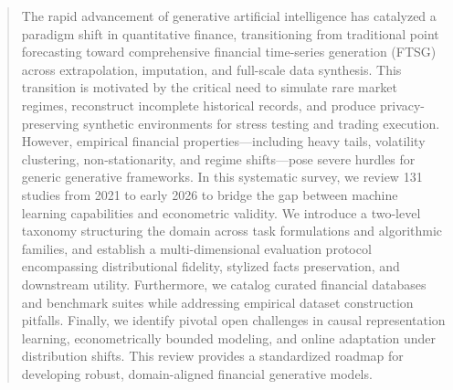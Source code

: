 \begin{abstract}
The rapid advancement of generative artificial intelligence has catalyzed a paradigm shift in quantitative finance, transitioning from traditional point forecasting toward comprehensive financial time-series generation (FTSG) across extrapolation, imputation, and full-scale data synthesis. This transition is motivated by the critical need to simulate rare market regimes, reconstruct incomplete historical records, and produce privacy-preserving synthetic environments for stress testing and trading execution. However, empirical financial properties---including heavy tails, volatility clustering, non-stationarity, and regime shifts---pose severe hurdles for generic generative frameworks. In this systematic survey, we review 131 studies from 2021 to early 2026 to bridge the gap between machine learning capabilities and econometric validity. We introduce a two-level taxonomy structuring the domain across task formulations and algorithmic families, and establish a multi-dimensional evaluation protocol encompassing distributional fidelity, stylized facts preservation, and downstream utility. Furthermore, we catalog curated financial databases and benchmark suites while addressing empirical dataset construction pitfalls. Finally, we identify pivotal open challenges in causal representation learning, econometrically bounded modeling, and online adaptation under distribution shifts. This review provides a standardized roadmap for developing robust, domain-aligned financial generative models.
\end{abstract}